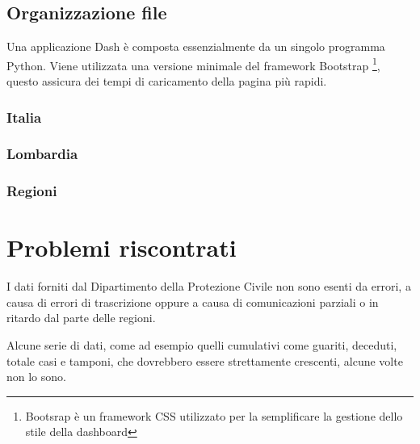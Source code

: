 \subsection{Organizzazione file}
Una applicazione Dash è composta essenzialmente da un singolo programma Python.
Viene utilizzata una versione minimale del framework Bootstrap \footnote{Bootsrap è un framework CSS utilizzato per la semplificare la gestione dello stile della dashboard}, questo assicura dei tempi di caricamento della pagina più rapidi.

\subsubsection{Italia}


\subsubsection{Lombardia}


\subsubsection{Regioni}




\section{Problemi riscontrati}
I dati forniti dal Dipartimento della Protezione Civile non sono esenti da errori, a causa di errori di trascrizione oppure a causa di comunicazioni parziali o in ritardo dal parte delle regioni.

\noindent Alcune serie di dati, come ad esempio quelli cumulativi come guariti, deceduti, totale casi e tamponi, che dovrebbero essere strettamente crescenti, alcune volte non lo sono.

